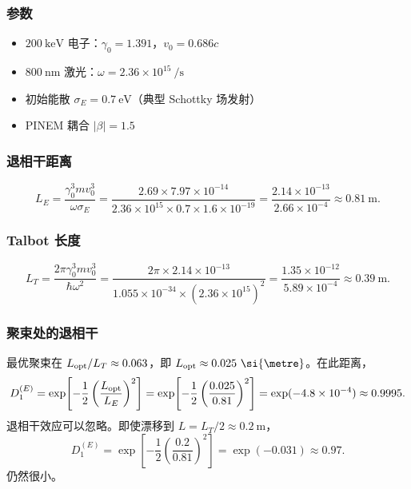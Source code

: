 \subsubsection{参数}

\begin{itemize}
\item $200\ \si{\kilo\electronvolt}$ 电子：$\gamma_0=1.391$，$v_0=0.686c$
\item $800\ \si{\nano\metre}$ 激光：$\omega=2.36\times10^{15}\ \si{\per\second}$
\item 初始能散 $\sigma_E=0.7\ \si{\electronvolt}$（典型 Schottky 场发射）
\item PINEM 耦合 $|\beta|=1.5$
\end{itemize}

\subsubsection{退相干距离}

\begin{equation}
L_E=\frac{\gamma_0^3mv_0^3}{\omega\sigma_E}
=\frac{2.69\times7.97\times10^{-14}}{2.36\times10^{15}\times0.7\times1.6\times10^{-19}}
=\frac{2.14\times10^{-13}}{2.66\times10^{-4}}
\approx 0.81\ \si{\metre}.
\end{equation}

\subsubsection{Talbot 长度}

\begin{equation}
L_T=\frac{2\pi\gamma_0^3mv_0^3}{\hbar\omega^2}
=\frac{2\pi\times2.14\times10^{-13}}{1.055\times10^{-34}\times(2.36\times10^{15})^2}
=\frac{1.35\times10^{-12}}{5.89\times10^{-4}}
\approx 0.39\ \si{\metre}.
\end{equation}

\subsubsection{聚束处的退相干}

最优聚束在 $L_{\rm opt}/L_T\approx 0.063$，即 $L_{\rm opt}\approx 0.025\ \si{\metre}$。在此距离，
\begin{equation}
D_1^{(E)}=\exp\!\left[-\frac{1}{2}\left(\frac{L_{\rm opt}}{L_E}\right)^2\right]
=\exp\!\left[-\frac{1}{2}\left(\frac{0.025}{0.81}\right)^2\right]
=\exp(-4.8\times10^{-4})\approx 0.9995.
\end{equation}
退相干效应可以忽略。即使漂移到 $L=L_T/2\approx 0.2\ \si{\metre}$，
\begin{equation}
D_1^{(E)}=\exp\!\left[-\frac{1}{2}\left(\frac{0.2}{0.81}\right)^2\right]
=\exp(-0.031)\approx 0.97.
\end{equation}
仍然很小。

